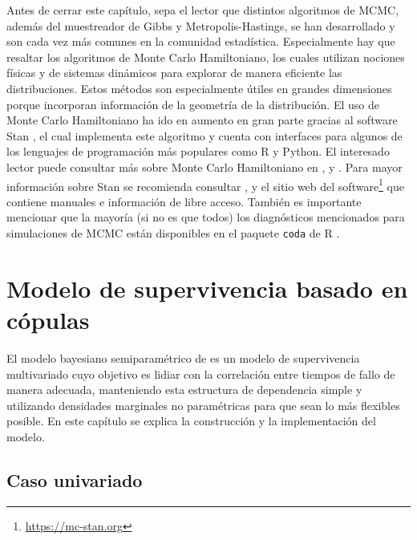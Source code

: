 \documentclass[11pt,a4paper]{article}
\begin{document}
Antes de cerrar este capítulo, sepa el lector que distintos algoritmos de MCMC, además del muestreador de Gibbs y Metropolis-Hastings, se han desarrollado y son cada vez más comunes en la comunidad estadística. Especialmente hay que resaltar los algoritmos de Monte Carlo Hamiltoniano, los cuales utilizan nociones físicas y de sistemas dinámicos para explorar de manera eficiente las distribuciones. Estos métodos son especialmente útiles en grandes dimensiones porque incorporan información de la geometría de la distribución. El uso de Monte Carlo Hamiltoniano ha ido en aumento en gran parte gracias al software Stan \citep{stan}, el cual implementa este algoritmo y cuenta con interfaces para algunos de los lenguajes de programación más populares como R y Python. El interesado lector puede consultar más sobre Monte Carlo Hamiltoniano en \citet{neal}, \citet{betancourt} y \citet{gelman}. Para mayor información sobre Stan se recomienda consultar \citet{gelman}, \citet{kruschke} y el sitio web del software\footnote{ \url{https://mc-stan.org}} que contiene manuales e información de libre acceso. También es importante mencionar 
que la mayoría (si no es que todos) los diagnósticos mencionados para simulaciones de MCMC están disponibles en el paquete \texttt{coda} de R \citep{coda}.

\newpage

\section{Modelo de supervivencia basado en cópulas}
\label{elmodelo}

El modelo bayesiano semiparamétrico de \citet{nieto} es un modelo de supervivencia multivariado cuyo objetivo es lidiar con la correlación entre tiempos de fallo de manera adecuada, manteniendo esta estructura de dependencia simple y utilizando densidades marginales no paramétricas para que sean lo más flexibles posible. En este capítulo se explica la construcción y la implementación del modelo.

\subsection{Caso univariado}
\end{document}
